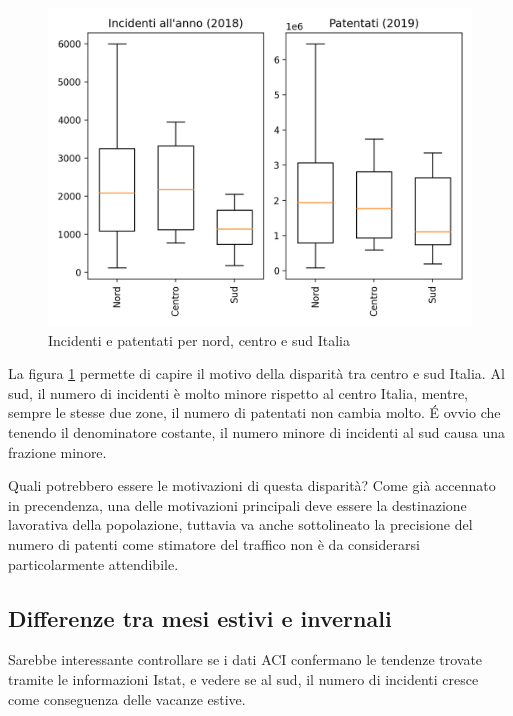 \documentclass[a4paper]{report}
\begin{document}
\begin{figure}
    \includegraphics[width=\linewidth]{../src/incidenti/incidenti_aci/mappe_regioni/incidenti_patenti_box.png}
    \caption{Incidenti e patentati per nord, centro e sud Italia}
    \label{fig:incidenti-patentati-box}
\end{figure}

La figura \ref{fig:incidenti-patentati-box} permette di capire il motivo della disparità 
tra centro e sud Italia.
Al sud, il numero di incidenti è molto minore rispetto al centro Italia, mentre, 
sempre le stesse due zone, il numero di patentati non cambia molto. 
\'E ovvio che tenendo il denominatore costante, il numero minore di incidenti al 
sud causa una frazione minore.

Quali potrebbero essere le motivazioni di questa disparità?
Come già accennato in precendenza, una delle motivazioni principali 
deve essere la destinazione lavorativa della popolazione, tuttavia va anche sottolineato 
la precisione del numero di patenti come stimatore del traffico non è da considerarsi 
particolarmente attendibile.

\subsection{Differenze tra mesi estivi e invernali}

Sarebbe interessante controllare se i dati ACI confermano le tendenze trovate tramite le 
informazioni Istat, e vedere se al sud, il numero di incidenti cresce come 
conseguenza delle vacanze estive.
\end{document}
